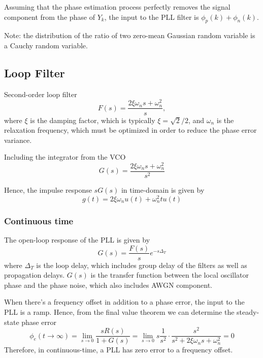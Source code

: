 \documentclass[a4paper]{article}
\begin{document}
Assuming that the phase estimation process perfectly removes the signal component from the phase of $Y_k$, the input to the PLL filter is $\phi_p(k) + \phi_n(k)$.

Note: the distribution of the ratio of two zero-mean Gaussian random variable is a Cauchy random variable.

\subsection{Loop Filter}
Second-order loop filter
\begin{equation}
F(s) = \frac{2\xi\omega_ns + \omega_n^2}{s},
\end{equation}
where $\xi$ is the damping factor, which is typically $\xi = \sqrt{2}/2$, and $\omega_n$ is the relaxation frequency, which must be optimized in order to reduce the phase error variance.

Including the integrator from the VCO
\begin{equation}
G(s) = \frac{2\xi\omega_ns + \omega_n^2}{s^2}
\end{equation}

Hence, the impulse response $sG(s)$ in time-domain is given by
\begin{equation}
g(t) = 2\xi\omega_nu(t) + \omega_n^2tu(t)
\end{equation}

\subsubsection{Continuous time}

The open-loop response of the PLL is given by
\begin{equation}
G(s) = \frac{F(s)}{s}e^{-s\Delta_T}
\end{equation}
where $\Delta_T$ is the loop delay, which includes group delay of the filters as well as propagation delays. $G(s)$ is the transfer function between the local oscillator phase and the phase noise, which also includes AWGN component. 

When there's a frequency offset in addition to a phase error, the input to the PLL is a ramp. Hence, from the final value theorem we can determine the steady-state phase error
\begin{equation}
	\phi_e(t\to\infty) = \lim_{s\to 0} \frac{sR(s)}{1 + G(s)} = \lim_{s\to 0}s\frac{1}{s^2}\cdot\frac{s^2}{s^2 + 2\xi\omega_ns + \omega_n^2} = 0
\end{equation}
Therefore, in continuous-time, a PLL has zero error to a frequency offset.
\end{document}
